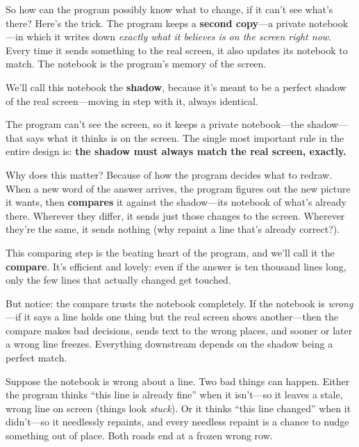 \documentclass[11pt,twoside]{book}
\begin{document}
So how can the program possibly know what to change, if it can't see what's
there? Here's the trick. The program keeps a \textbf{second copy}---a
private notebook---in which it writes down \emph{exactly what it believes is
on the screen right now}. Every time it sends something to the real screen,
it also updates its notebook to match. The notebook is the program's memory
of the screen.

We'll call this notebook the \textbf{shadow}, because it's meant to be a
perfect shadow of the real screen---moving in step with it, always
identical.

\begin{insight}
The program can't see the screen, so it keeps a private notebook---the
shadow---that says what it thinks is on the screen. The single most
important rule in the entire design is: \textbf{the shadow must always
match the real screen, exactly.}
\end{insight}

Why does this matter? Because of how the program decides what to redraw. When
a new word of the answer arrives, the program figures out the new picture it
wants, then \textbf{compares} it against the shadow---its notebook of what's
already there. Wherever they differ, it sends just those changes to the
screen. Wherever they're the same, it sends nothing (why repaint a line
that's already correct?).

This comparing step is the beating heart of the program, and we'll call it
the \textbf{compare}. It's efficient and lovely: even if the answer is ten
thousand lines long, only the few lines that actually changed get touched.

But notice: the compare trusts the notebook completely. If the notebook is
\emph{wrong}---if it says a line holds one thing but the real screen shows
another---then the compare makes bad decisions, sends text to the wrong
places, and sooner or later a wrong line freezes. Everything downstream
depends on the shadow being a perfect match.

\begin{pic}
Suppose the notebook is wrong about a line. Two bad things can happen. Either
the program thinks ``this line is already fine'' when it isn't---so it leaves
a stale, wrong line on screen (things look \emph{stuck}). Or it thinks ``this
line changed'' when it didn't---so it needlessly repaints, and every needless
repaint is a chance to nudge something out of place. Both roads end at a
frozen wrong row.
\end{pic}
\end{document}
